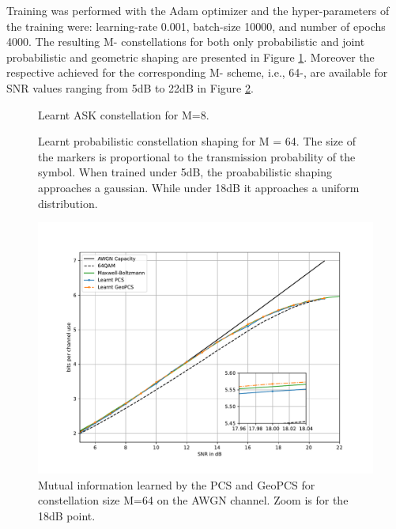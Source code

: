 Training was performed with the Adam optimizer and the hyper-parameters of the training were: learning-rate 0.001, batch-size 10000, and number of epochs 4000.
The resulting M- constellations for both only probabilistic and joint probabilistic and geometric shaping are presented in Figure \ref{fig:starkMASK}. Moreover the respective achieved  for the corresponding M- scheme, i.e., 64-, are available for SNR values ranging from 5dB to 22dB in Figure \ref{fig:starkPerf}.
	
\begin{figure}[h]
	\subfigure[SNR = 5dB]{
         
         \label{subfig:stark5dB}
    }
%         
%         
    \subfigure[SNR = 18dB]{
         
         \label{subfig:stark18dB}
    }
    \caption{Learnt ASK constellation for M=8.}
    \label{fig:starkMASK}
\end{figure}

\begin{figure}[h]
	\subfigure[5dB]{
		
		\label{subfig:stark_pcs_5db}
	}
	\subfigure[18db]{
		
		\label{subfig:stark_pcs_18db}
	}
	\caption{Learnt probabilistic constellation shaping for M = 64. The size of the markers is proportional to the transmission probability of the symbol. When trained under 5dB, the proababilistic shaping approaches a gaussian. While under 18dB it approaches a uniform distribution. }
\end{figure}

\begin{figure}[H]
	\centering
	\includegraphics[width=\textwidth]{figs/stark_gcs.pdf}
    \caption{Mutual information learned by the PCS and GeoPCS for constellation size M=64 on the AWGN channel. Zoom is for the 18dB point.}
    \label{fig:starkPerf}
\end{figure}


